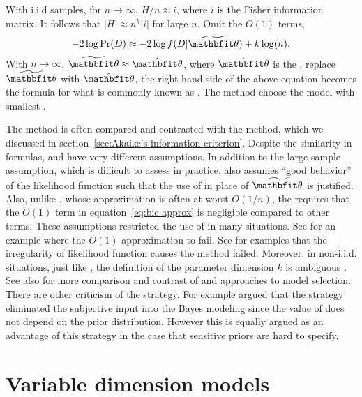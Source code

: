With i.i.d samples, for $n\to\infty$, $H/n \approx i$, where $i$ is the Fisher
information matrix. It follows that $\lvert H \rvert \approx n^k \lvert i
\rvert$ for large $n$. Omit the $O(1)$ terms,
\begin{equation}
  -2\log\Pr(D) \approx -2\log f(D|\tbth) + k\log(n).
\end{equation}
With $n\to\infty$, $\tbth\approx\hat{\bth}$, where $\hat{\bth}$ is the \mle,
replace $\tbth$ with $\hat{\bth}$, the right hand side of the above equation
becomes the formula for what is commonly known as \bic. The \bic method choose
the model with smallest \bic.

The \bic method is often compared and contrasted with the \aic method, which
we discussed in section~\ref{sec:Akaike's information criterion}. Despite the
similarity in formulas, \aic and \bic have very different assumptions. In
addition to the large sample assumption, which is difficult to assess in
practice, \bic also assumes ``good behavior'' of the likelihood function such
that the use of \mle in place of $\tbth$ is justified. Also, unlike \aic,
whose approximation is often at worst $O(1/n)$, the \bic requires that the
$O(1)$ term in equation~\eqref{eq:bic approx} is negligible compared to other
terms. These assumptions restricted the use of \bic in many situations. See
\textcite{Gelfand1994} for an example where the $O(1)$ approximation to fail.
See \textcite{Berger2001} for examples that the irregularity of likelihood
function causes the \bic method failed. Moreover, in non-i.i.d. situations,
just like \aic, the definition of the parameter dimension $k$ is ambiguous
\parencite{Spiegelhalter1998, Kass1995}. See also \textcite[][chap.~5 and
chap.~6]{Burnham2002} for more comparison and contrast of \aic and \bic
approaches to model selection. There are other criticism of the \bic strategy.
For example \textcite[][chap.~7]{Robert2007} argued that the \bic strategy
eliminated the subjective input into the Bayes modeling since the value of
\bic does not depend on the prior distribution. However this is equally argued
as an advantage of this strategy in the case that sensitive priors are hard to
specify.

\section{Variable dimension models}
\label{sec:Variable dimension models}

